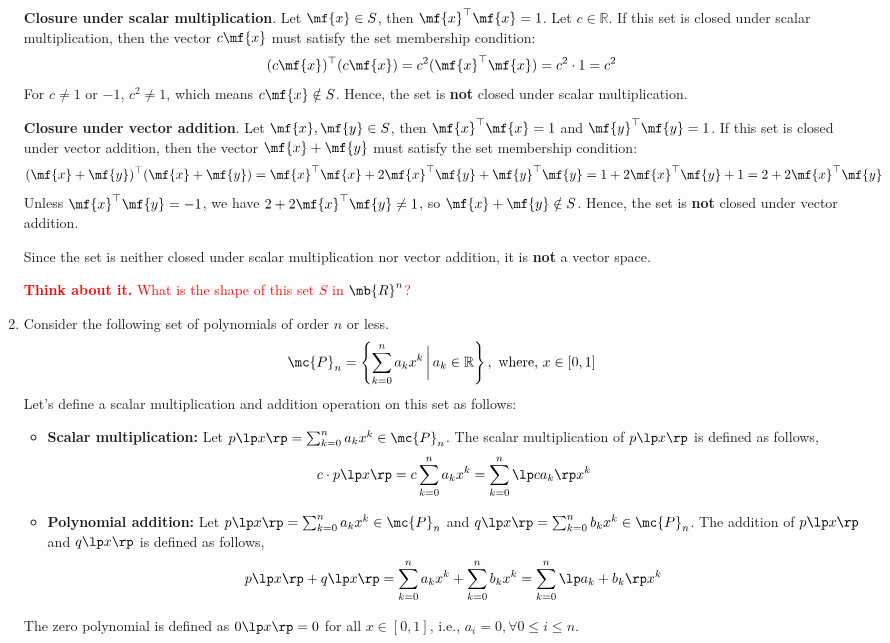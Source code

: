 \begin{enumerate}
\begin{boxedstuff}
        \textbf{Closure under scalar multiplication}. Let $\mf{x} \in S$, then $\mf{x}^\top \mf{x} = 1$. Let $c \in \mathbb{R}$. If this set is closed under scalar multiplication, then the vector $c\mf{x}$ must satisfy the set membership condition:
        $$ (c\mf{x})^\top (c\mf{x}) = c^2 (\mf{x}^\top \mf{x}) = c^2 \cdot 1 = c^2 $$
        For $c \neq 1$ or $-1$, $c^2 \neq 1$, which means $c\mf{x} \notin S$. Hence, the set is \textbf{not} closed under scalar multiplication.

        \textbf{Closure under vector addition}. Let $\mf{x}, \mf{y} \in S$, then $\mf{x}^\top \mf{x} = 1$ and $\mf{y}^\top \mf{y} = 1$. If this set is closed under vector addition, then the vector $\mf{x} + \mf{y}$ must satisfy the set membership condition:
        $$ (\mf{x} + \mf{y})^\top (\mf{x} + \mf{y}) = \mf{x}^\top \mf{x} + 2 \mf{x}^\top \mf{y} + \mf{y}^\top \mf{y} = 1 + 2\mf{x}^\top \mf{y} + 1 = 2 + 2 \mf{x}^\top \mf{y} $$
        Unless $\mf{x}^\top \mf{y} = -1$, we have $2 + 2\mf{x}^\top \mf{y} \neq 1$, so $\mf{x} + \mf{y} \notin S$. Hence, the set is \textbf{not} closed under vector addition.

        Since the set is neither closed under scalar multiplication nor vector addition, it is \textbf{not} a vector space.

        \textcolor{red}{\textbf{Think about it.} What is the shape of this set $S$ in $\mb{R}^n$?}
    \end{boxedstuff}

    \item Consider the following set of polynomials of order $n$ or less.
    \[ \mc{P}_n = \left\{ \sum_{k=0}^n a_k x^k \, \bigg\vert \, a_k \in \mathbb{R} \right\}, \,\, \text{where, } x \in \left[0, 1\right] \]
    Let's define a scalar multiplication and addition operation on this set as follows:
    \begin{itemize}
        \item \textbf{Scalar multiplication:} Let $p\lp x \rp = \sum_{k=0}^n a_k x^k \in \mc{P}_n$. The scalar multiplication of $p\lp x \rp$ is defined as follows,
        $$c \cdot p\lp x \rp = c \sum_{k=0}^n a_k x^k = \sum_{k=0}^n \lp c a_k \rp x^k $$ 
        \item \textbf{Polynomial addition:} Let $p\lp x \rp = \sum_{k=0}^n a_k x^k \in \mc{P}_n$ and $q\lp x \rp = \sum_{k=0}^n b_k x^k \in \mc{P}_n$. The addition of $p\lp x \rp$ and $q \lp x \rp$ is defined as follows,
        $$ p\lp x \rp + q \lp x \rp = \sum_{k=0}^n a_k x^k + \sum_{k=0}^n b_k x^k = \sum_{k=0}^n \lp a_k + b_k \rp x^k $$
    \end{itemize}
    The zero polynomial is defined as $0\lp x \rp = 0$ for all $x \in \left[0, 1\right]$, i.e., $a_i = 0, \forall 0 \leq i \leq n$.
    

\end{enumerate}
